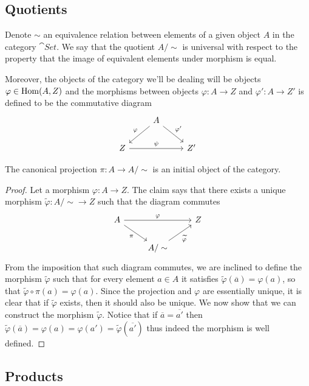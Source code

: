 \subsection{Quotients}

Denote \(\sim\) an equivalence relation between elements of a given object
\(A\) in the category \(\cat{Set}\). We say that the quotient \(A/\sim\) is
universal with respect to the property that the image of equivalent elements
under morphism is equal. 

Moreover, the objects of the category we'll be dealing will be objects
\(\varphi \in \operatorname{Hom}(A, Z)\) and the morphisms between objects \(\varphi : A \to
Z\) and \(\varphi' : A \to Z'\) is defined to be the commutative diagram
\[
  \begin{tikzcd}
      &A \ar[dl, swap, "\varphi"] \ar[dr, "\varphi'"] & \\
    Z \ar[rr, "\psi"] & &Z'
  \end{tikzcd}
\]

\begin{proposition}
   The canonical projection \(\pi : A \to A/\sim\) is an initial object of the
   category.
\end{proposition}

\begin{proof}
   Let a morphism \(\varphi: A \to Z\). The claim says that there exists a
   unique morphism \(\tilde{\varphi} : A/\sim \to Z\) such that the diagram
   commutes
    \[
      \begin{tikzcd}
        A \ar[rr, "\varphi"] \ar[dr, swap, "\pi"] 
          & 
            & Z \\
          & A/\sim \ar[ur, swap, "\widetilde \varphi"]
      \end{tikzcd}
   \] 
   From the imposition that such diagram commutes, we are inclined to define the
   morphism \(\tilde\varphi\) such that for every element \(a \in A\) it
   satisfies \(\tilde\varphi(\overline{a}) = \varphi(a)\), so that
   \(\tilde\varphi \circ \pi (a) = \varphi(a)\). Since the projection and
   \(\varphi\) are essentially unique, it is clear that if \(\tilde\varphi\)
   exists, then it should also be unique. We now show that we can construct the
   morphism \(\tilde\varphi\). Notice that if \(\overline{a} = \overline{a'}\) 
   then \(\tilde\varphi(\overline{a}) = \varphi(a)= \varphi(a') =
   \tilde\varphi(\overline{a'})\) thus indeed the morphism is well defined.
\end{proof}

\subsection{Products}

